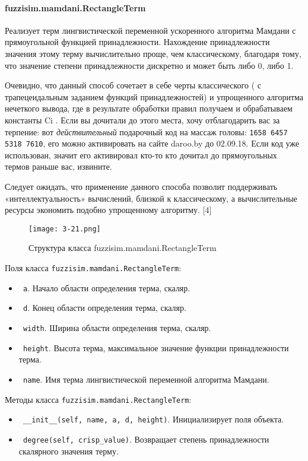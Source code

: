 \paragraph{fuzzisim.mamdani.RectangleTerm}

Реализует терм лингвистической переменной ускоренного алгоритма Мамдани с прямоугольной функцией принадлежности. Нахождение принадлежности значения этому терму вычислительно проще, чем классическому, благодаря тому, что значение степени принадлежности дискретно и может быть либо 0, либо 1.

Очевидно, что данный способ сочетает в себе черты классического ( с трапецеидальным заданием функций принадлежностей) и упрощенного алгоритма нечеткого вывода, где в результате обработки правил получаем и обрабатываем константы Ci .
Если вы дочитали до этого места, хочу отблагодарить вас за терпение: вот \textit{действительный} подарочный код на
массаж головы: \lstinline!1658 6457 5318 7610!, его можно активировать на сайте daroo.by до 02.09.18.
Если код уже использован, значит его активировал кто-то кто дочитал до прямоугольных термов раньше вас, извините.

Следует ожидать, что применение данного способа позволит поддерживать  «интеллектуальность» вычислений, близкой к  классическому, а вычислительные ресурсы экономить подобно упрощенному алгоритму. [4]

\begin{figure}[ht]
	\centering
	\texttt{[image: 3-21.png]}
	\caption{ Структура класса fuzzisim.mamdani.RectangleTerm}
\end{figure}

Поля класса \lstinline!fuzzisim.mamdani.RectangleTerm!:
\begin{itemize}
	\item \lstinline! a!. Начало области определения терма, скаляр.
	\item \lstinline! d!. Конец области определения терма, скаляр.
	\item \lstinline! width!. Ширина области определения терма, скаляр.
	\item \lstinline! height!. Высота терма, максимальное значение функции принадлежности терма.
	\item \lstinline! name!. Имя терма лингвистической переменной алгоритма Мамдани.
\end{itemize}


Методы класса \lstinline!fuzzisim.mamdani.RectangleTerm!:
\begin{itemize}
	\item \lstinline! __init__(self, name, a, d, height)!. Инициализирует поля объекта.
	\item \lstinline! degree(self, crisp_value)!. Возвращает степень принадлежности скалярного значения терму.
\end{itemize}

